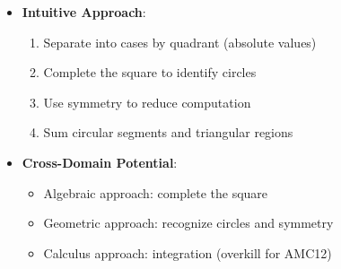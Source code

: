 \documentclass[]{article}
\begin{document}
\begin{problemconfigbox}
\begin{itemize}[leftmargin=*]
    \item \textbf{Intuitive Approach}: 
    \begin{enumerate}
        \item Separate into cases by quadrant (absolute values)
        \item Complete the square to identify circles
        \item Use symmetry to reduce computation
        \item Sum circular segments and triangular regions
    \end{enumerate}
    
    \item \textbf{Cross-Domain Potential}: 
    \begin{itemize}
        \item Algebraic approach: complete the square
        \item Geometric approach: recognize circles and symmetry
        \item Calculus approach: integration (overkill for AMC12)
    \end{itemize}
\end{itemize}
\end{problemconfigbox}
\end{document}
